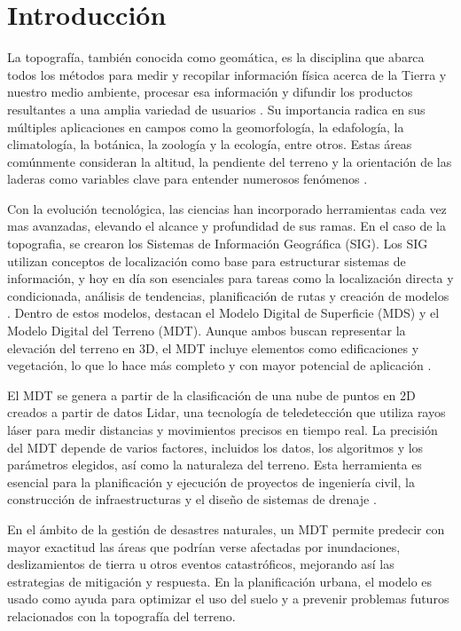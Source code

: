\section{Introducción}

La topografía, también conocida como geomática, es la disciplina que abarca todos los métodos para medir y recopilar información física acerca de la Tierra y nuestro medio ambiente, procesar esa información y difundir los productos resultantes a una amplia variedad de usuarios \cite{Topografia, Topografia-def2}.
Su importancia radica en sus múltiples aplicaciones en campos como la geomorfología, la edafología, la climatología, la botánica, la zoología y la ecología, entre otros. Estas áreas comúnmente consideran la altitud, la pendiente del terreno y la orientación de las laderas como variables clave para entender numerosos fenómenos \cite{MDT-aplicacion}.
\espacio

Con la evolución tecnológica, las ciencias han incorporado herramientas cada vez mas avanzadas, elevando el alcance y profundidad de sus ramas. En el caso de la topografia, se crearon los Sistemas de Información Geográfica (SIG). Los SIG utilizan conceptos de localización como base para estructurar sistemas de información, y hoy en día son esenciales para tareas como la localización directa y condicionada, análisis de tendencias, planificación de rutas y creación de modelos \cite{GIS-definicion}. Dentro de estos modelos, destacan el Modelo Digital de Superficie (MDS) y el Modelo Digital del Terreno (MDT). Aunque ambos buscan representar la elevación del terreno en 3D, el MDT incluye elementos como edificaciones y vegetación, lo que lo hace más completo y con mayor potencial de aplicación \cite{MDT-effects}.
\espacio

El MDT se genera a partir de la clasificación de una nube de puntos en 2D creados a partir de datos Lidar, una tecnología de teledetección que utiliza rayos láser para medir distancias y movimientos precisos en tiempo real. La precisión del MDT depende de varios factores, incluidos los datos, los algoritmos y los parámetros elegidos, así como la naturaleza del terreno. Esta herramienta es esencial para la planificación y ejecución de proyectos de ingeniería civil, la construcción de infraestructuras y el diseño de sistemas de drenaje \cite{MDT-tecnica}.
\espacio

En el ámbito de la gestión de desastres naturales, un MDT permite predecir con mayor exactitud las áreas que podrían verse afectadas por inundaciones, deslizamientos de tierra u otros eventos catastróficos, mejorando así las estrategias de mitigación y respuesta. En la planificación urbana, el modelo es usado como ayuda para optimizar el uso del suelo y a prevenir problemas futuros relacionados con la topografía del terreno.
\espacio

